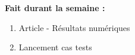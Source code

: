 \textbf{Fait durant la semaine :}
\begin{enumerate}[label=\textbullet]
	\item Article - Résultats numériques
	\item Lancement cas tests
\end{enumerate}
